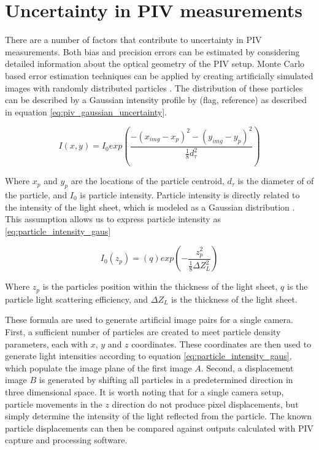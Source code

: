 \section{Uncertainty in PIV measurements}

There are a number of factors that contribute to uncertainty in PIV 
measurements. Both bias and precision errors can be estimated by considering 
detailed information about the optical geometry of the PIV setup. Monte Carlo 
based error estimation techniques can be applied by creating artificially 
simulated images with randomly distributed particles \cite{adeyinka2005}. 
The distribution of these particles can be described by a Gaussian intensity  
profile by (flag, reference) as described in equation 
\ref{eq:piv_gaussian_uncertainty}.

\begin{equation}
	I(x,y) = I_0exp \left( \frac{-(x_{img} - x_p)^2 - (y_{img} - y_p)^2}
	{\frac{1}{8}d_\tau^2} \right)
	\label{eq:piv_gaussian_uncertainty}
\end{equation}

Where $x_p$ and $y_p$ are the locations of the particle centroid, $d_\tau$ is 
the diameter of of the particle, and $I_0$ is particle intensity. Particle 
intensity is directly related to the intensity of the light sheet, which is 
modeled as a Gaussian distribution \cite{PIVuncertAIAA}. This assumption allows 
us 
to express particle intensity as \ref{eq:particle_intensity_gaus}

\begin{equation}
	I_0(z_p) = (q)exp\left(- \frac{z_p^2}{\frac{1}{8}\Delta Z_L^2}\right)
	\label{eq:particle_intensity_gaus}
\end{equation}

Where $z_p$ is the particles position within the thickness of the light sheet, 
$q$ is the particle light scattering efficiency, and $\Delta Z_L$ is the 
thickness of the light sheet.

These formula are used to generate artificial image pairs for a single camera. 
First, a sufficient number of particles are created to meet particle density 
parameters, each with $x$, $y$ and $z$ coordinates. These coordinates are then 
used to generate light intensities according to equation 
\ref{eq:particle_intensity_gaus}, which populate the image plane of the first 
image $A$. Second, a displacement image $B$ is generated by shifting all 
particles in a predetermined direction in three dimensional space. It is worth 
noting that for a single camera setup, particle movements in the $z$ direction 
do not produce pixel displacements, but simply determine the intensity of the 
light reflected from the particle. The known particle displacements can then be 
compared against outputs calculated with PIV capture and processing software.

